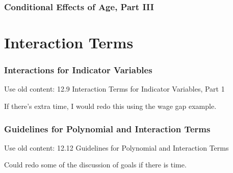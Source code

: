 \documentclass[12pt, block=fill]{beamer}
\begin{document}
\begin{frame}
  \frametitle{Conditional Effects of Age, Part III}
  \footnotesize \centering \renewcommand{\arraystretch}{0.9}
  


\end{frame}





\section{Interaction Terms}

\begin{frame}
  \frametitle{Interactions for Indicator Variables}
  Use old content: 12.9 Interaction Terms for Indicator Variables,
  Part 1
  
  If there's extra time, I would redo this using the wage gap example.
\end{frame}



\begin{frame}
  \frametitle{Guidelines for Polynomial and Interaction Terms}
  Use old content: 12.12 Guidelines for Polynomial and Interaction
  Terms
  
  Could redo some of the discussion of goals if there is time.
\end{frame}
\end{document}

